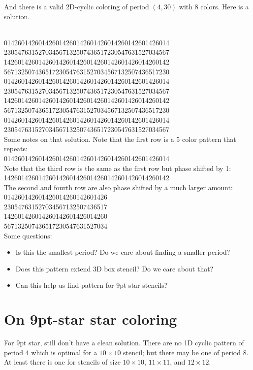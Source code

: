 \documentclass{article}
\newcommand{\highlightsol}[1]{{\color{blue}#1}}
\begin{document}
And there is a valid 2D-cyclic coloring of period $(4,30)$ with 8
colors. Here is a solution.

~\\
\highlightsol{014260142601426014260142601426}014260142601426014\\
\highlightsol{230547631527034567132507436517}230547631527034567\\
\highlightsol{142601426014260142601426014260}142601426014260142\\
\highlightsol{567132507436517230547631527034}567132507436517230\\
014260142601426014260142601426014260142601426014\\
230547631527034567132507436517230547631527034567\\
142601426014260142601426014260142601426014260142\\
567132507436517230547631527034567132507436517230\\
014260142601426014260142601426014260142601426014\\
230547631527034567132507436517230547631527034567\\

Some notes on that solution. Note that the first row is a 5 color pattern that repeats:\\
\highlightsol{01426}0142601426014260142601426014260142601426014\\

Note that the third row is the same as the first row but phase shifted by 1:\\
1426\highlightsol{01426}014260142601426014260142601426014260142\\

The second and fourth row are also phase shifted by a much larger amount:\\
014260142601426014260142601426\\
\highlightsol{230547631527034}567132507436517\\
142601426014260142601426014260\\
567132507436517\highlightsol{230547631527034}\\

Some questions:
\begin{itemize}
\item Is this the smallest period? Do we care about finding a smaller period?
\item Does this pattern extend 3D box stencil? Do we care about that?
\item Can this help us find pattern for 9pt-star stencils?
\end{itemize}


\section{On 9pt-star star coloring}

For 9pt star, still don't have a clean solution.  There are no 1D
cyclic pattern of period 4 which is optimal for a $10 \times 10$
stencil; but there may be one of period 8. At least there is one for
stencils of size $10 \times 10$, $11 \times 11$, and $12 \times 12$.
\end{document}
